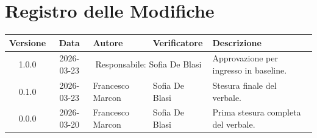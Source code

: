 \section*{Registro delle Modifiche}
\begin{table}[ht]
	\centering
	\renewcommand{\arraystretch}{1.5}
	\begin{tabularx}{\textwidth}{c c l l X}
		\toprule
		\textbf{Versione} & \textbf{Data} & \textbf{Autore} & \textbf{Verificatore} & \textbf{Descrizione} \\
		\midrule
		1.0.0 & 2026-03-23 & \multicolumn{2}{c}{Responsabile: Sofia De Blasi} & Approvazione per ingresso in baseline. \\
		0.1.0 & 2026-03-23 & Francesco Marcon & Sofia De Blasi & Stesura finale del verbale. \\
		0.0.0 & 2026-03-20 & Francesco Marcon & Sofia De Blasi & Prima stesura completa del verbale. \\
		\bottomrule
	\end{tabularx}
\end{table}